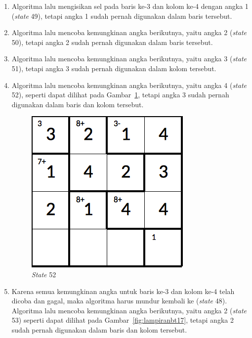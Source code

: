 \begin{enumerate}
\item Algoritma lalu mengisikan sel pada baris ke-3 dan kolom ke-4 dengan angka 1 (\textit{state} 49), tetapi angka 1 sudah pernah digunakan dalam baris tersebut.
\item Algoritma lalu mencoba kemungkinan angka berikutnya, yaitu angka 2 (\textit{state} 50), tetapi angka 2 sudah pernah digunakan dalam baris tersebut.
\item Algoritma lalu mencoba kemungkinan angka berikutnya, yaitu angka 3 (\textit{state} 51), tetapi angka 3 sudah pernah digunakan dalam kolom tersebut.
\item Algoritma lalu mencoba kemungkinan angka berikutnya, yaitu angka 4 (\textit{state} 52), seperti dapat dilihat pada Gambar~\ref{fig:lampiranbt16}, tetapi angka 3 sudah pernah digunakan dalam baris dan kolom tersebut.

\begin{figure}
\centering
\captionsetup{justification=centering}
\includegraphics[scale=0.333]{Gambar/backtracking/State52}
\caption[\textit{State} 52]{\textit{State} 52}
\label{fig:lampiranbt16}
\end{figure}

\item Karena semua kemungkinan angka untuk baris ke-3 dan kolom ke-4 telah dicoba dan gagal, maka algoritma harus mundur kembali ke (\textit{state} 48). Algoritma lalu mencoba kemungkinan angka berikutnya, yaitu angka 2 (\textit{state} 53) seperti dapat dilihat pada Gambar~\ref{fig:lampiranbt17}, tetapi angka 2 sudah pernah digunakan dalam baris dan kolom tersebut.


\end{enumerate}
